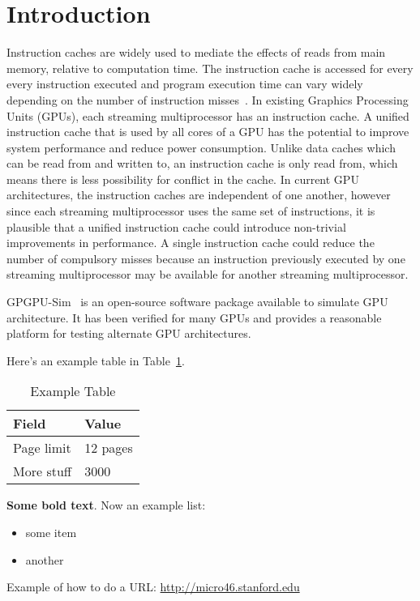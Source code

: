 \section{Introduction}


Instruction caches are widely used to mediate the effects of reads from main memory, relative to computation time. The instruction cache is accessed for every every instruction executed and program execution time can vary widely depending on the number of instruction misses~\cite{arnold94}. In existing Graphics Processing Units (GPUs), each streaming multiprocessor has an instruction cache. A unified instruction cache that is used by all cores of a GPU has the potential to improve system performance and reduce power consumption. Unlike data caches which can be read from and written to, an instruction cache is only read from, which means there is less possibility for conflict in the cache. In current GPU architectures, the instruction caches are independent of one another, however since each streaming multiprocessor uses the same set of instructions, it is plausible that a unified instruction cache could introduce non-trivial improvements in performance. A single instruction cache could reduce the number of compulsory misses because an instruction previously executed by one streaming multiprocessor may be available for another streaming multiprocessor. 

GPGPU-Sim~\cite{bakhodayuan09} is an open-source software package available to simulate GPU architecture. It has been verified for many GPUs and provides a reasonable platform for testing alternate GPU architectures.


Here's an example table in Table~\ref{table:example}.

\begin{table}[h!]
  \centering
  \begin{tabular}{|l|l|}
    \hline
    \textbf{Field} & \textbf{Value}\\
    \hline
    \hline
    Page limit & 12 pages\\
    More stuff & 3000\\
  \end{tabular}
  \caption{Example Table}
  \label{table:example}
\end{table}

\textbf{Some bold text}. Now an example list:

\begin{itemize}
\item some item
\item another
\end{itemize}


Example of how to do a URL: \href{http://micro46.stanford.edu}{http://micro46.stanford.edu}

